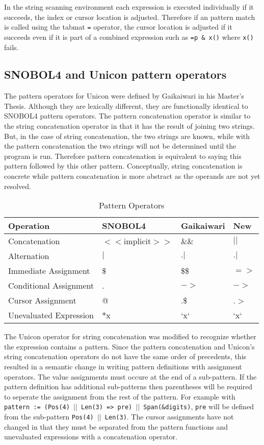 \documentclass{article}
\begin{document}
In the string scanning environment each expression is executed individually if it succeeds, the index or cursor location is adjusted.  Therefore if an pattern match is called using the tabmat \texttt{=} operator, the cursor location is adjusted if it succeeds even if it is part of a combined expression such as \texttt{=p \& x()} where \texttt{x()} fails.
\subsection{SNOBOL4 and Unicon pattern operators}
The pattern operators for Unicon were defined by Gaikaiwari in his Master's Thesis.  Although they are lexically different, they are functionally identical to SNOBOL4 pattern operators.  The pattern concatenation operator is similar to the string concatenation operator in that it has the result of joining two strings.  But, in the case of string concatenation, the two strings are known, while with the pattern concatenation the two strings will not be determined until the program is run.  Therefore pattern concatenation is equivalent to saying this pattern followed by this other pattern.  Conceptually, string concatenation is concrete while pattern concatenation is more abstract as the operands are not yet resolved.  

\begin{table}[ht]
	\caption{Pattern Operators}
	\centering
	\begin{tabular}{|l|l|l|l|}
		\hline\hline
		Operation & SNOBOL4 & Gaikaiwari & New\\
		\hline
		Concatenation & $<<$implicit$>>$ & \&\& & $||$ \\
		Alternation & $|$ & $.|$ & $.|$ \\
		\hline
		Immediate Assignment & \$ & \$\$ & $=>$ \\
		Conditional Assignment & . & $->$ & $->$\\
		Cursor Assignment & @ & .\$ & .$>$ \\
		\hline
		Unevaluated Expression & $*$x & `x` & `x` \\
		\hline
	\end{tabular}
\end{table}
The Unicon operator for string concatenation was modified to recognize whether the expression contains a pattern.  Since the pattern concatenation and Unicon's string concatenation operators do not have the same order of precedents, this resulted in a semantic change in writing pattern definitions with assignment operators.  The value assignments must occure at the end of a sub-pattern.  If the pattern definition has additional sub-patterns then parentheses will be required to seperate the assignment from the rest of the pattern.  For example with \texttt{pattern := (Pos(4) $||$ Len(3) => pre) $||$ Span(\&digits)}, \texttt{pre} will be defined from the sub-pattern \texttt{Pos(4) $||$ Len(3)}.  The cursor assignments have not changed in that they must be separated from the pattern functions and unevaluated expressions with a concatenation operator.
\end{document}
